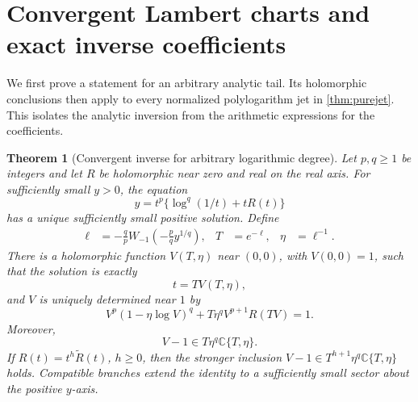 \documentclass[11pt,a4paper]{article}
\numberwithin{equation}{section}
\newtheorem{theorem}{Theorem}[section]
\theoremstyle{definition}
\theoremstyle{remark}
\newcommand{\C}{\mathbb C}
\begin{document}
\section{Convergent Lambert charts and exact inverse coefficients}
\label{sec:inverse}

We first prove a statement for an arbitrary analytic tail. Its holomorphic conclusions then
apply to every normalized polylogarithm jet in \cref{thm:purejet}.
This isolates the analytic inversion from the arithmetic expressions
for the coefficients.

\begin{theorem}[Convergent inverse for arbitrary logarithmic degree]
\label{thm:inverse}
Let $p,q\ge1$ be integers and let $R$ be holomorphic near zero and
real on the real axis. For sufficiently small $y>0$, the equation
\begin{equation}\label{eq:inverse-model}
 y=t^p\{\log^q(1/t)+tR(t)\}
\end{equation}
has a unique sufficiently small positive solution. Define
\begin{align}
 \ell&=-\frac qpW_{-1}\left(-\frac pq y^{1/q}\right),&
 T&=e^{-\ell},&\eta&=\ell^{-1}.\label{eq:Lambert-core}
\end{align}
There is a holomorphic function $V(T,\eta)$ near $(0,0)$, with
$V(0,0)=1$, such that the solution is exactly
\begin{equation}\label{eq:inverse-chart}
 t=TV(T,\eta),
\end{equation}
and $V$ is uniquely determined near $1$ by
\begin{equation}\label{eq:chart-model}
 V^p(1-\eta\log V)^q+
 T\eta^qV^{p+1}R(TV)=1.
\end{equation}
Moreover,
\begin{equation}\label{eq:support}
 V-1\in T\eta^q\C\{T,\eta\}.
\end{equation}
If $R(t)=t^h\widetilde R(t)$, $h\ge0$, then the stronger inclusion
$V-1\in T^{h+1}\eta^q\C\{T,\eta\}$ holds. Compatible branches
extend the identity to a sufficiently small sector about the positive
$y$-axis.
\end{theorem}
\end{document}
